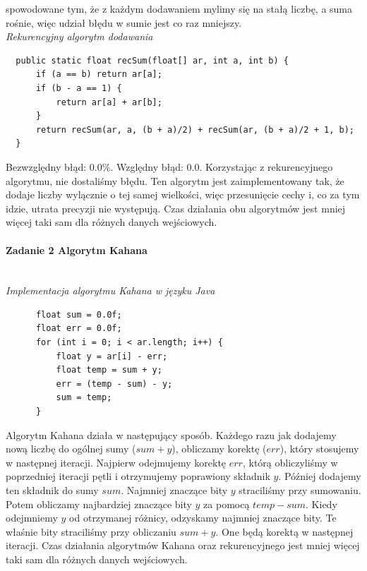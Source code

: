 \documentclass[12pt,a4paper]{article}
\begin{document}
  spowodowane tym, że z każdym dodawaniem mylimy się na stałą liczbę, a suma
  rośnie, więc udział błędu w sumie jest co raz mniejszy.\vspace{3mm}\\
  \emph{Rekurencyjny algorytm dodawania}
  \begin{Verbatim}
  public static float recSum(float[] ar, int a, int b) {
      if (a == b) return ar[a];
      if (b - a == 1) {
          return ar[a] + ar[b];
      }
      return recSum(ar, a, (b + a)/2) + recSum(ar, (b + a)/2 + 1, b);
  }
  \end{Verbatim}
  Bezwzględny błąd: $ 0.0 \% $. \newline
  Względny błąd: $ 0.0 $. \newline
  Korzystając z rekurencyjnego algorytmu, nie dostaliśmy błędu. Ten algorytm
  jest zaimplementowany tak, że dodaje liczby wylącznie o tej samej wielkości,
  więc przesunięcie cechy i, co za tym idzie, utrata precyzji nie występują.
  \newline
  Czas działania obu algorytmów jest mniej więcej taki sam dla różnych danych
  wejściowych.
  \paragraph{Zadanie 2 Algorytm Kahana}\mbox{}\vspace{3mm}\\
  \emph{Implementacja algorytmu Kahana w języku Java}
  \begin{Verbatim}
      float sum = 0.0f;
      float err = 0.0f;
      for (int i = 0; i < ar.length; i++) {
          float y = ar[i] - err;
          float temp = sum + y;
          err = (temp - sum) - y;
          sum = temp;
      }
  \end{Verbatim}
  Algorytm Kahana działa w następujący sposób. Każdego razu jak dodajemy
  nową liczbę do ogólnej sumy ($sum + y$), obliczamy korektę ($err$),
  który stosujemy w następnej iteracji. Najpierw odejmujemy korektę $err$,
  którą obliczyliśmy w poprzedniej iteracji pętli i otrzymujemy poprawiony
  składnik $y$. Później dodajemy ten składnik do sumy $sum$. Najmniej znaczące
  bity $y$ straciliśmy przy sumowaniu. Potem obliczamy najbardziej znaczące
  bity $y$ za pomocą $temp - sum$. Kiedy odejmniemy $y$ od otrzymanej różnicy,
  odzyskamy najmniej znaczące bity. Te właśnie bity straciliśmy przy obliczaniu
  $sum + y$. One będą korektą w następnej iteracji. \newline
  Czas działania algorytmów Kahana oraz rekurencyjnego jest mniej więcej taki
  sam dla różnych danych wejściowych.
\end{document}
